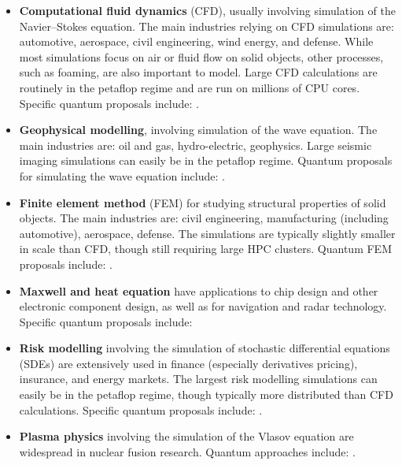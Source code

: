 \begin{refsection}
\begin{itemize}
\item \textbf{Computational fluid dynamics} (CFD), usually involving simulation of the Navier--Stokes equation. The main industries relying on CFD simulations are: automotive, aerospace, civil engineering, wind energy, and defense. While most simulations focus on air or fluid flow on solid objects, other processes, such as foaming, are also important to model. Large CFD calculations are routinely in the petaflop regime and are run on millions of CPU cores. Specific quantum proposals include: \cite{li2023potential,succi2023ensemble,itani2023quantum,joczik2022cost,oz2022solving,gaitan2021finding,gaitan2020finding,chen2022quantum,lapworth2022hybrid}.
\item \textbf{Geophysical modelling}, involving simulation of the wave equation. The main industries are: oil and gas, hydro-electric, geophysics. Large seismic imaging simulations can easily be in the petaflop regime. Quantum proposals for  simulating the wave equation include: \cite{moradi2018quantum,henderson2023quantum,dukalski2021toward}.
\item \textbf{Finite element method} (FEM) for studying structural properties of solid objects. The main industries are: civil engineering, manufacturing (including automotive), aerospace, defense. The simulations are typically slightly smaller in scale than CFD, though still requiring large HPC clusters.  Quantum FEM proposals include: \cite{jin2022time, montanaro2016quantum, van2019quantum,zhang2021quantum}. 
\item \textbf{Maxwell and heat equation} have applications to chip design and other electronic component design, as well as for navigation and radar technology. Specific quantum proposals include: \cite{clader2013preconditioned,jin2022time,linden2022quantum}
\item \textbf{Risk modelling} involving the simulation of stochastic differential equations (SDEs) are extensively used in finance (especially derivatives pricing), insurance, and energy markets. The largest risk modelling simulations can easily be in the petaflop regime, though typically more distributed than CFD calculations. Specific quantum proposals include: \cite{rebentrost2018QuantumFinance,an2021quantum,ramos2021quantum,focardi2020quantum,li2023quantum}. 
\item \textbf{Plasma physics} involving the simulation of the Vlasov equation are widespread in nuclear fusion  research. Quantum approaches include: \cite{novikau2022PlasmaSimulation,engel2019quantum,dodin2021applications}.
\end{itemize}


\end{refsection}
